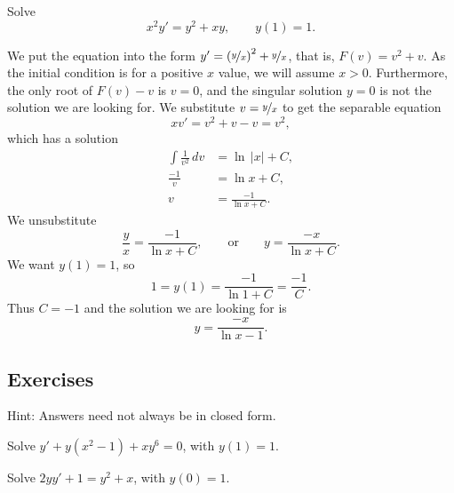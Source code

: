 \begin{example}
Solve
\begin{equation*}
x^2y' = y^2+xy, \qquad y(1)=1.
\end{equation*}

We put the equation into
the form $y'= {\left(\nicefrac{y}{x}\right)}^2+\nicefrac{y}{x}$,
that is, $F(v) = v^2+v$.
As the initial condition is for a positive $x$ value,
we will assume $x > 0$.
Furthermore, the only root of $F(v)-v$ is $v=0$,
and the singular solution $y=0$ is not the solution
we are looking for.
We substitute $v=\nicefrac{y}{x}$ to get
the separable equation
\begin{equation*}
xv' = v^2+v-v = v^2 ,
\end{equation*}
which has a solution
\begin{equation*}
\begin{aligned}
\int \frac{1}{v^2} \,dv &= \ln \, \lvert x \rvert + C , \\
\frac{-1}{v} &= \ln x + C , \\
v &= \frac{-1}{\ln x  + C} .
\end{aligned}
\end{equation*}
We unsubstitute
\begin{equation*}
\frac{y}{x} = \frac{-1}{\ln x  + C} ,
\qquad
\text{or}
\qquad
y = \frac{-x}{\ln x  + C} .
\end{equation*}
We want $y(1)=1$, so
\begin{equation*}
1 = y(1) = \frac{-1}{\ln 1 + C} = \frac{-1}{C} .
\end{equation*}
Thus $C = -1$ and
the solution we are looking for is
\begin{equation*}
y = \frac{-x}{\ln x -1} .
\end{equation*}
\end{example}

\subsection{Exercises}

Hint: Answers need not always be in closed form.

\begin{exercise}
Solve
$y'+ y(x^2-1)+xy^6 = 0$, with $y(1)=1$.
\end{exercise}

\begin{exercise}
Solve $2yy' + 1 = y^2 + x$, with $y(0)=1$.
\end{exercise}

